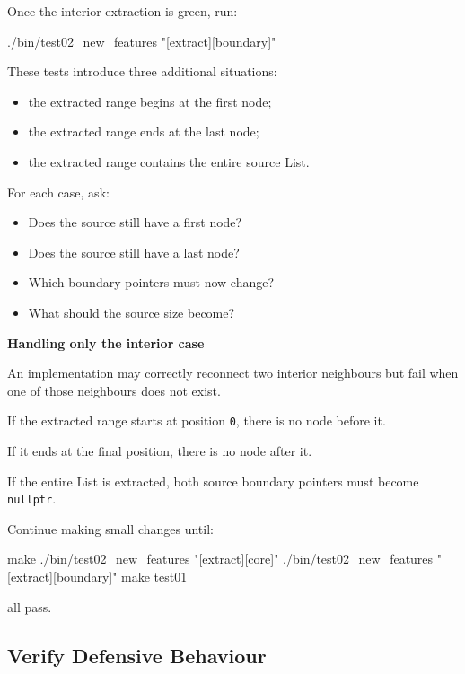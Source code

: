 \documentclass{csc2059practical}
\begin{document}
Once the interior extraction is green, run:

\begin{terminal}
./bin/test02_new_features "[extract][boundary]"
\end{terminal}

These tests introduce three additional situations:

\begin{itemize}
    \item the extracted range begins at the first node;
    \item the extracted range ends at the last node;
    \item the extracted range contains the entire source List.
\end{itemize}

For each case, ask:

\begin{itemize}
    \item Does the source still have a first node?
    \item Does the source still have a last node?
    \item Which boundary pointers must now change?
    \item What should the source size become?
\end{itemize}

\begin{commonerror}
\textbf{Handling only the interior case}

An implementation may correctly reconnect two interior neighbours but fail when one of those neighbours does not exist.

If the extracted range starts at position \texttt{0}, there is no node before it.

If it ends at the final position, there is no node after it.

If the entire List is extracted, both source boundary pointers must become \texttt{nullptr}.
\end{commonerror}

Continue making small changes until:

\begin{terminal}
make
./bin/test02_new_features "[extract][core]"
./bin/test02_new_features "[extract][boundary]"
make test01
\end{terminal}

all pass.


\subsection{Verify Defensive Behaviour}
\end{document}
